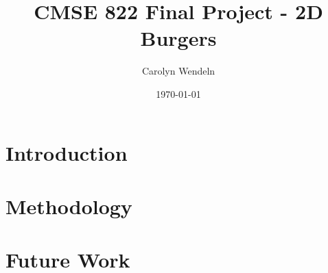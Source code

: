 \documentclass{article}
\title{CMSE 822 Final Project - 2D Burgers}
\author{Carolyn Wendeln}
\date{\today}
\begin{document}
\maketitle

\section{Introduction}

\section{Methodology}

\section{Future Work}
\end{document}
